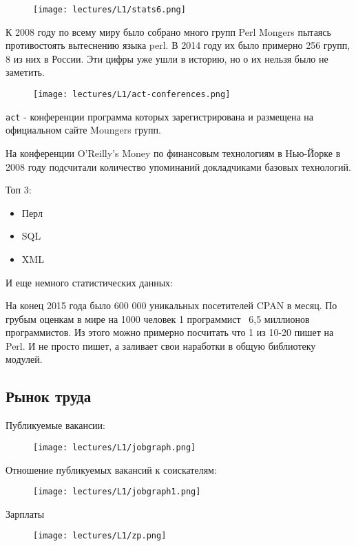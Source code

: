 \begin{figure}[H] \centering
  \texttt{[image: lectures/L1/stats6.png]}
\end{figure}\noindent

К 2008 году по всему миру было собрано много групп Perl Mongers пытаясь противостоять вытеснению языка perl. В 2014 году их было примерно 256 групп, 8 из них в России. Эти цифры уже ушли в историю, но о их нельзя было не заметить.

\begin{figure}[H] \centering
  \texttt{[image: lectures/L1/act-conferences.png]}
\end{figure}\noindent

\verb|act| - конференции программа которых зарегистрирована и размещена на официальном сайте Moungers групп.

На конференции O'Reilly's Money по финансовым технологиям в Нью-Йорке в 2008 году подсчитали количество упоминаний докладчиками базовых технологий.

Топ 3:
\begin{itemize}
 \item Перл
 \item SQL
 \item XML
\end{itemize}

И еще немного статистических данных:

На конец 2015 года было 600 000 уникальных посетителей CPAN в месяц. По грубым оценкам в мире на 1000 человек 1 программист ~6,5 миллионов программистов. Из этого можно примерно посчитать что 1 из 10-20 пишет на Perl. И не просто пишет, а заливает свои наработки в общую библиотеку модулей.


\subsection{Рынок труда}

Публикуемые вакансии:
\begin{figure}[H] \centering
  \texttt{[image: lectures/L1/jobgraph.png]}
\end{figure}\noindent

Отношение публикуемых вакансий к соискателям:
\begin{figure}[H] \centering
  \texttt{[image: lectures/L1/jobgraph1.png]}
\end{figure}\noindent

Зарплаты
\begin{figure}[H] \centering
  \texttt{[image: lectures/L1/zp.png]}
\end{figure}\noindent

